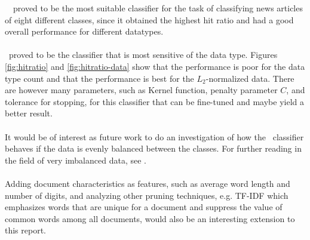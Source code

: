 \mn\ \nb\ proved to be the most suitable classifier for the task of classifying news articles of eight different classes, since it obtained the highest hit ratio and had a good overall performance for different datatypes.
\\\\
\svm\ proved to be the classifier that is most sensitive of the data type. Figures \ref{fig:hitratio} and \ref{fig:hitratio-data} show that the performance is poor for the data type count and that the performance is best for the $L_2$-normalized data. There are however many parameters, such as Kernel function, penalty parameter $C$, and tolerance for stopping, for this classifier that can be fine-tuned and maybe yield a better result.
\\\\
It would be of interest as future work to do an investigation of how the \rf\ classifier behaves if the data is evenly balanced between the classes. For further reading in the field of very imbalanced data, see \cite{Chen}.
\\\\
Adding document characteristics as features, such as average word length and number of digits, and analyzing other pruning techniques, e.g. TF-IDF which emphasizes words that are unique for a document and suppress the value of common words among all documents, would also be an interesting extension to this report.
